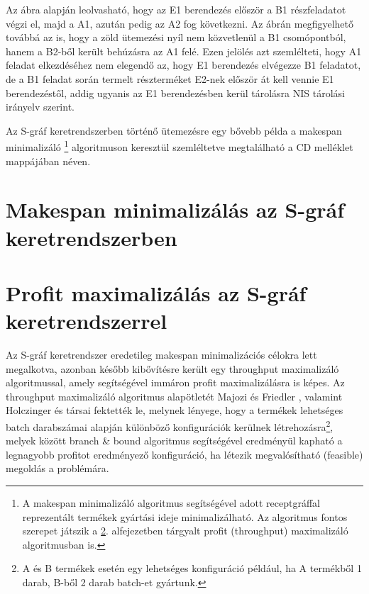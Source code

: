 Az ábra alapján leolvasható, hogy az E1 berendezés először a B1 részfeladatot végzi el, majd a A1, azután pedig az A2 fog következni.
Az ábrán megfigyelhető továbbá az is, hogy a zöld ütemezési nyíl nem közvetlenül a B1 csomópontból, hanem a B2-ből került behúzásra az A1 felé.
Ezen jelölés azt szemlélteti, hogy A1 feladat elkezdéséhez nem elegendő az, hogy E1 berendezés elvégezze B1 feladatot, de a B1 feladat során termelt részterméket E2-nek először át kell vennie E1 berendezéstől, addig ugyanis az E1 berendezésben kerül tárolásra NIS tárolási irányelv szerint.

Az S-gráf keretrendszerben történő ütemezésre egy bővebb példa a makespan minimalizáló \footnote{A makespan minimalizáló algoritmus segítségével adott receptgráffal reprezentált termékek gyártási ideje minimalizálható. Az algoritmus fontos szerepet játszik a \ref{SgraphProfitMax}. alfejezetben tárgyalt profit (throughput) maximalizáló algoritmusban is.} algoritmuson keresztül szemléltetve megtalálható a CD melléklet  mappájában  néven. 
\section{Makespan minimalizálás az S-gráf keretrendszerben}
\section{Profit maximalizálás az S-gráf keretrendszerrel} \label{SgraphProfitMax}
Az S-gráf keretrendszer eredetileg makespan minimalizációs célokra lett megalkotva, azonban később kibővítésre került egy throughput maximalizáló algoritmussal, amely segítségével immáron profit maximalizálásra is képes.
Az throughput maximalizáló algoritmus alapötletét Majozi és Friedler \cite{doi:10.1021ie0604472}, valamint Holczinger és társai \cite{HOLCZINGER2007649} fektették le, melynek lényege, hogy a termékek lehetséges batch darabszámai alapján különböző konfigurációk kerülnek létrehozásra\footnote{A és B termékek esetén egy lehetséges konfiguráció például, ha A termékből 1 darab, B-ből 2 darab batch-et gyártunk.}, melyek között branch \& bound algoritmus segítségével eredményül kapható a legnagyobb profitot eredményező konfiguráció, ha létezik megvalósítható (feasible) megoldás a problémára.

